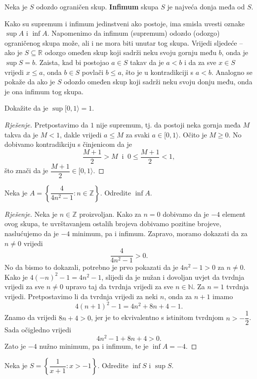 \begin{definition}
Neka je $S$ odozdo ograničen skup. \textbf{Infimum} skupa $S$ je najveća donja međa od $S$.
\end{definition}

Kako su supremum i infimum jedinstveni ako postoje, ima smisla uvesti oznake $\sup{A}$ i $\inf{A}$.
Napomenimo da infimum (supremum) odozdo (odozgo) ograničenog skupa može, ali i ne mora biti unutar tog skupa. Vrijedi sljedeće -- ako je $S\subseteq \mathbb{R}$ odozgo omeđen skup koji sadrži neku svoju gornju među $b$, onda je $\sup{S}=b$. Zaista, kad bi postojao $a\in S$ takav da je $a<b$ i da za sve $x\in S$ vrijedi $x\leq a$, onda $b\in S$ povlači $b\leq a$, što je u kontradikciji s $a<b$. Analogno se pokaže da ako je $S$ odozdo omeđen skup koji sadrži neku svoju donju među, onda je ona infimum tog skupa.
\begin{exercise}
Dokažite da je $\sup{[0, 1\rangle}=1$.
\end{exercise}
\begin{proof}[Rješenje]
Pretpostavimo da $1$ nije supremum, tj. da postoji neka gornja međa $M$ takva da je $M<1$, dakle vrijedi $a\leq M$ za svaki $a\in [0, 1\rangle$. Očito je $M\geq 0$. No dobivamo kontradikciju s činjenicom da je $$\dfrac{M+1}{2}>M\;\;\text{i}\;\;0\leq \dfrac{M+1}{2}<1,$$ što znači da je $\dfrac{M+1}{2}\in [0, 1\rangle$.
\end{proof}
\begin{exercise}
Neka je $A=\left\{\dfrac{4}{4n^2-1} : n\in \mathbb{Z}\right\}$. Odredite $\inf{A}$.
\end{exercise}
\begin{proof}[Rješenje]
Neka je $n\in \mathbb{Z}$ proizvoljan. Kako za $n=0$ dobivamo da je $-4$ element ovog skupa, te uvrštavanjem ostalih brojeva dobivamo pozitine brojeve, naslućujemo da je $-4$ minimum, pa i infimum. Zapravo, moramo dokazati da za $n\neq 0$ vrijedi $$\dfrac{4}{4n^2-1}>0.$$ No da bismo to dokazali, potrebno je prvo pokazati da je $4n^2-1>0$ za $n\neq 0$. Kako je $4(-n)^2-1=4n^2-1$, slijedi da je nužan i dovoljan uvjet da tvrdnja vrijedi za sve $n\neq 0$ upravo taj da tvrdnja vrijedi za sve $n\in \mathbb{N}$. Za $n=1$ tvrdnja vrijedi. Pretpostavimo li da tvrdnja vrijedi za neki $n$, onda za $n+1$ imamo $$4(n+1)^2-1=4n^2+8n+4-1.$$ Znamo da vrijedi $8n+4>0$, jer je to ekvivalentno s istinitom tvrdnjom $n>-\dfrac{1}{2}$. Sada očigledno vrijedi $$4n^2-1+8n+4>0.$$ Zato je $-4$ nužno minimum, pa i infimum, te je $\inf{A}=-4$.
\end{proof}
\begin{exercise}
\label{13}
Neka je $S=\left\{\dfrac{1}{x+1} : x>-1\right\}$. Odredite $\inf{S}$ i $\sup{S}$.
\end{exercise}
